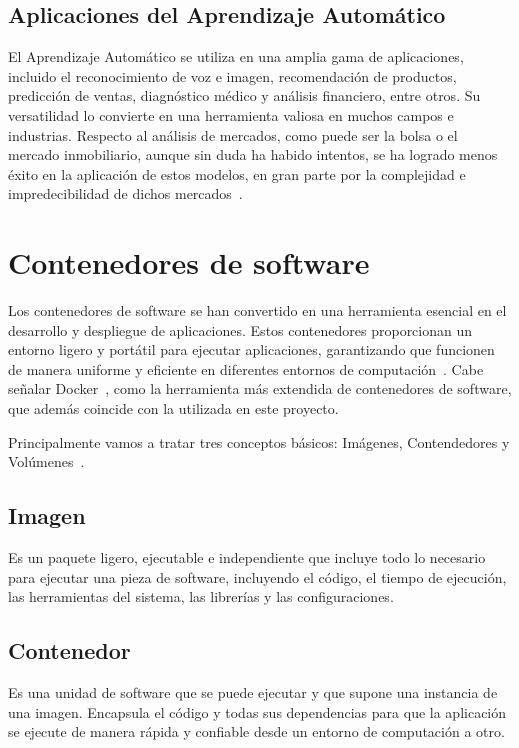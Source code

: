 \subsection{Aplicaciones del Aprendizaje Automático}

El Aprendizaje Automático se utiliza en una amplia gama de aplicaciones, incluido el reconocimiento de voz e imagen, recomendación de productos, predicción de ventas, diagnóstico médico y análisis financiero, entre otros. Su versatilidad lo convierte en una herramienta valiosa en muchos campos e industrias. Respecto al análisis de mercados, como puede ser la bolsa o el mercado inmobiliario, aunque sin duda ha habido intentos, se ha logrado menos éxito en la aplicación de estos modelos, en gran parte por la complejidad e impredecibilidad de dichos mercados~\cite{shinde2018}. 

\section{Contenedores de software}

Los contenedores de software se han convertido en una herramienta esencial en el desarrollo y despliegue de aplicaciones. Estos contenedores proporcionan un entorno ligero y portátil para ejecutar aplicaciones, garantizando que funcionen de manera uniforme y eficiente en diferentes entornos de computación~\cite{syed2015}. Cabe señalar Docker~\cite{mouat2015}, como la herramienta más extendida de contenedores de software, que además coincide con la utilizada en este proyecto.

Principalmente vamos a tratar tres conceptos básicos: Imágenes, Contendedores y Volúmenes~\cite{mouat2015}. 

\subsection{Imagen} Es un paquete ligero, ejecutable e independiente que incluye todo lo necesario para ejecutar una pieza de software, incluyendo el código, el tiempo de ejecución, las herramientas del sistema, las librerías y las configuraciones.

\subsection{Contenedor} Es una unidad de software que se puede ejecutar y que supone una instancia de una imagen. Encapsula el código y todas sus dependencias para que la aplicación se ejecute de manera rápida y confiable desde un entorno de computación a otro.

